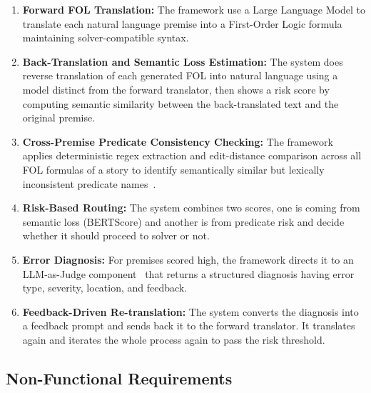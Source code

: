 \begin{enumerate}
    \item \textbf{Forward FOL Translation:} The framework use a Large Language Model to translate each natural language premise into a First-Order Logic formula maintaining solver-compatible syntax.
    
    \item \textbf{Back-Translation and Semantic Loss Estimation:} The system does reverse translation of each generated FOL into natural language using a model distinct from the forward translator, then shows a risk score by computing semantic similarity between the back-translated text and the original premise.

    \item \textbf{Cross-Premise Predicate Consistency Checking:} The framework applies deterministic regex extraction and edit-distance comparison across all FOL formulas of a story to identify semantically similar but lexically inconsistent predicate names~\cite{thatikonda2024strategies}.

    \item \textbf{Risk-Based Routing:} The system combines two scores, one is coming from semantic loss (BERTScore) and another is from predicate risk and decide whether it should proceed to solver or not.

    \item \textbf{Error Diagnosis:} For premises scored high, the framework directs it to an LLM-as-Judge component~\cite{zheng2023judging} that returns a structured diagnosis having error type, severity, location, and feedback.

    \item \textbf{Feedback-Driven Re-translation:} The system converts the diagnosis into a feedback prompt and sends back it to the forward translator. It translates again and iterates the whole process again to pass the risk threshold.
\end{enumerate}

\subsection{Non-Functional Requirements}

